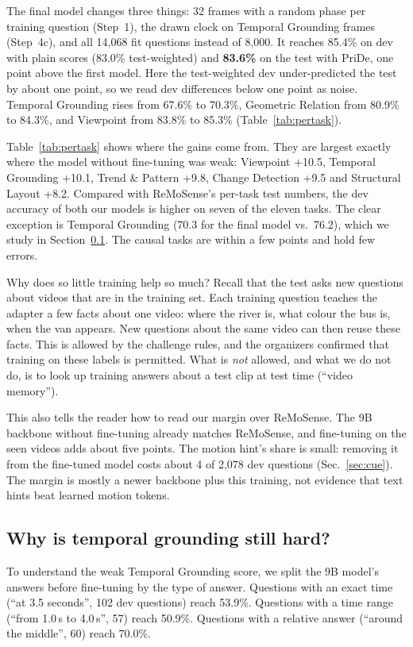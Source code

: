 The final model changes three things: 32 frames with a random phase per
training question (Step~1), the drawn clock on Temporal Grounding frames
(Step~4c), and all 14,068 fit questions instead of 8,000. It reaches
85.4\% on dev with plain scores (83.0\% test-weighted) and \textbf{83.6\%}
on the test with PriDe, one point above the first model. Here the
test-weighted dev under-predicted the test by about one point, so we read
dev differences below one point as noise. Temporal Grounding rises from
67.6\% to 70.3\%, Geometric Relation from 80.9\% to 84.3\%, and
Viewpoint from 83.8\% to 85.3\% (Table~\ref{tab:pertask}).

Table~\ref{tab:pertask} shows where the gains come from. They are largest
exactly where the model without fine-tuning was weak: Viewpoint +10.5, Temporal
Grounding +10.1, Trend \& Pattern +9.8, Change Detection +9.5 and
Structural Layout +8.2. Compared with ReMoSense's per-task test numbers,
the dev accuracy of both our models is higher on seven of the eleven tasks. The clear
exception is Temporal Grounding (70.3 for the final model vs.\ 76.2), which we study in
Section~\ref{sec:h6}. The causal tasks are within a few points and hold few
errors.

Why does so little training help so much? Recall that the test asks new
questions about videos that are in the training set. Each training
question teaches the adapter a few facts about one video: where the river
is, what colour the bus is, when the van appears. New questions about the
same video can then reuse these facts. This is allowed by the challenge
rules, and the organizers confirmed that training on these labels is
permitted. What is \emph{not} allowed, and what we do not do, is to look up
training answers about a test clip at test time (``video memory'').

This also tells the reader how to read our margin over ReMoSense. The 9B
backbone without fine-tuning already matches ReMoSense, and fine-tuning on
the seen videos adds about five points. The motion hint's share is small:
removing it from the fine-tuned model costs about 4 of 2,078 dev questions
(Sec.~\ref{sec:cue}). The margin is mostly a newer backbone plus this
training, not evidence that text hints beat learned motion tokens.


\subsection{Why is temporal grounding still hard?}
\label{sec:h6}
To understand the weak Temporal Grounding score, we split the 9B model's answers before fine-tuning
by the type of answer. Questions with an exact time (``at
3.5 seconds'', 102 dev questions) reach 53.9\%. Questions with a time range
(``from 1.0\,s to 4.0\,s'', 57) reach 50.9\%. Questions with a relative
answer (``around the middle'', 60) reach 70.0\%.

